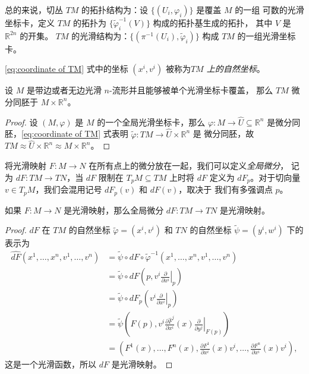 \documentclass[fontset=none]{Notes}
\begin{document}
\begin{remark}
  总的来说，切丛 $TM$ 的拓扑结构为：设 $\{(U_i,\varphi_i)\}$ 是覆盖 $M$ 的一组
  可数的光滑坐标卡，定义 $TM$ 的拓扑为  $\{\tilde\varphi_i^{-1}(V)\}$ 构成的拓扑基生成的拓扑，
  其中 $V$ 是 $\mathbb{R}^{2n}$ 的开集。
  $TM$ 的光滑结构为：$\{(\pi^{-1}(U_i),\tilde\varphi_i)\}$ 构成 $TM$ 的一组光滑坐标卡。
\end{remark}

\eqref{eq:coordinate of TM} 式中的坐标 $(x^i,v^i)$ 被称为\emph{$TM$ 上的自然坐标}。

\begin{proposition}
  设 $M$ 是带边或者无边光滑 $n$-流形并且能够被单个光滑坐标卡覆盖，
  那么 $TM$ 微分同胚于 $M\times\mathbb{R}^n$。
\end{proposition}
\begin{proof}
  设 $(M,\varphi)$ 是 $M$ 的一个全局光滑坐标卡，那么 $\varphi:M\to\hat U\subseteq\mathbb{R}^n$
  是微分同胚，\eqref{eq:coordinate of TM} 式表明 $\tilde{\varphi}:TM\to \hat U\times\mathbb{R}^n$ 是
  微分同胚，故 $TM\approx\hat U\times\mathbb{R}^n\approx M\times\mathbb{R}^n$。
\end{proof}

将光滑映射 $F:M\to N$ 在所有点上的微分放在一起，我们可以定义\emph{全局微分}，
记为 $dF:TM\to TN$，当 $dF$ 限制在 $T_pM\subseteq TM$ 上时将 $dF$ 定义为
$dF_p$。对于切向量 $v\in T_pM$，我们会混用记号 $dF_p(v)$ 和 $dF(v)$，取决于
我们有多强调点 $p$。

\begin{proposition}
  如果 $F:M\to N$ 是光滑映射，那么全局微分 $dF:TM\to TN$ 是光滑映射。
\end{proposition}
\begin{proof}
  $dF$ 在 $TM$ 的自然坐标 $\tilde\varphi=(x^i,v^i)$ 和 $TN$ 的自然坐标 $\tilde\psi=(y^i,w^i)$ 下的表示为
  \begin{align*}
    \widehat{dF}\left(x^1,\dots,x^n,v^1,\dots,v^n\right)&=
    \tilde{\psi}\circ dF\circ\tilde\varphi^{-1}\left(x^1,\dots,x^n,v^1,\dots,v^n\right)\\
    &=\tilde{\psi}\circ dF\left(p,v^i\!\left.\frac{\partial}{\partial x^i}\right|_{p}\right)\\
    &=\tilde\psi \circ dF_{p}\left(v^i\!\left.\frac{\partial}{\partial x^i}\right|_{p}\right)\\
    &=\tilde{\psi}\left(
      F(p),v^i\frac{\partial\hat F^j}{\partial x^i}(x)\left.\frac{\partial}{\partial y^j}\right|_{F(p)}
    \right)
    \\
    &=\left(
      F^1(x),\dots,F^n(x),
      \frac{\partial F^1}{\partial x^i}(x)v^i,\dots,
      \frac{\partial F^n}{\partial x^i}(x)v^i
    \right),
  \end{align*}
  这是一个光滑函数，所以 $dF$ 是光滑映射。
\end{proof}
\end{document}
